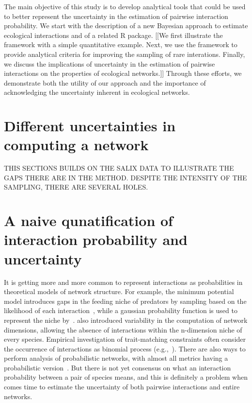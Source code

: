 \documentclass[12pt]{article}
\begin{document}
    The main objective of this study is to develop analytical tools that could be used to better represent the uncertainty in the estimation of pairwise interaction probability. We start with the description of a new Bayesian approach to estimate ecological interactions and of a related R package. [[We first illustrate the framework with a simple quantitative example. Next, we use the framework to provide analytical criteria for improving the sampling of rare interations. Finally, we discuss the implications of uncertainty in the estimation of pairwise interactions on the properties of ecological networks.]] Through these efforts, we demonstrate both the utility of our approach and the importance of acknowledging the uncertainty inherent in ecological networks.


\section*{Different uncertainties in computing a network}

THIS SECTIONS BUILDS ON THE SALIX DATA TO ILLUSTRATE THE GAPS THERE ARE IN THE METHOD. DESPITE THE INTENSITY OF THE SAMPLING, THERE ARE SEVERAL HOLES.



\section*{A naive qunatification of interaction probability and uncertainty}

  It is getting more and more common to represent interactions as probabilities in theoretical models of network structure. For example, the minimum potential model introduces gaps in the feeding niche of predators by sampling based on the likelihood of each interaction~\citep{Allesina2008}, while a gaussian probability function is used to represent the niche by~\citet{Williams2010}. \citet{Eklof2013} also introduced variability  in the computation of network dimensions, allowing the absence of interactions within the n-dimension niche of every species. Empirical investigation of trait-matching constraints often consider the occurrence of interactions as binomial process (e.g.,~\citealp{Rohr2016}). There are also ways to perform analysis of probabilistic networks, with almost all metrics having a probabilistic version~\citep{Poisot2016}. But there is not yet consensus on what an interaction probability between a pair of species means, and this is definitely a problem when comes time to estimate the uncertainty of both pairwise interactions and entire networks. 
\end{document}
